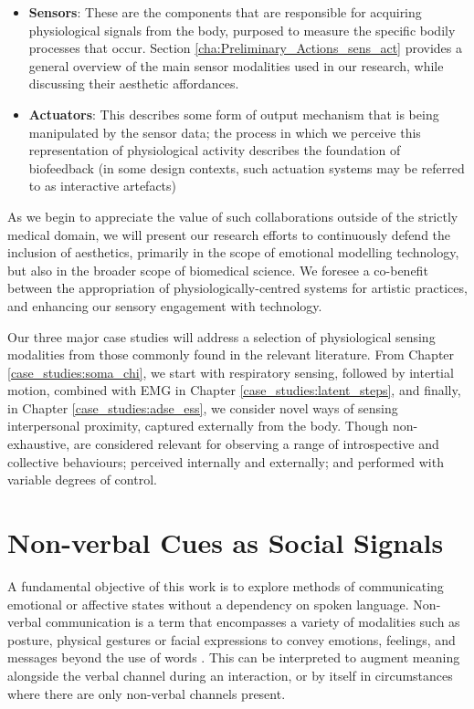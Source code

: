 \begin{itemize}
    \item \textbf{Sensors}: These are the components that are responsible for acquiring physiological signals from the body, purposed to measure the specific bodily processes that occur. Section \ref{cha:Preliminary_Actions_sens_act} provides a general overview of the main sensor modalities used in our research, while discussing their aesthetic affordances.
    \item \textbf{Actuators}: This describes some form of output mechanism that is being manipulated by the sensor data; the process in which we perceive this representation of physiological activity describes the foundation of biofeedback (in some design contexts, such actuation systems may be referred to as interactive artefacts)
\end{itemize}

As we begin to appreciate the value of such collaborations outside of the strictly medical domain, we will present our research efforts to continuously defend the inclusion of aesthetics, primarily in the scope of emotional modelling technology, but also in the broader scope of biomedical science. We foresee a co-benefit between the appropriation of physiologically-centred systems for artistic practices, and enhancing our sensory engagement with technology.

Our three major case studies will address a selection of physiological sensing modalities from those commonly found in the relevant literature. From Chapter \ref{case_studies:soma_chi}, we start with respiratory sensing, followed by intertial motion, combined with EMG in Chapter \ref{case_studies:latent_steps}, and finally, in Chapter \ref{case_studies:adse_ess}, we consider novel ways of sensing interpersonal proximity, captured externally from the body. Though non-exhaustive, are considered relevant for observing a range of introspective and collective behaviours; perceived internally and externally; and performed with variable degrees of control.

\section{Non-verbal Cues as Social Signals}

A fundamental objective of this work is to explore methods of communicating emotional or affective states without a dependency on spoken language. Non-verbal communication is a term that encompasses a variety of modalities such as posture, physical gestures or facial expressions to convey emotions, feelings, and messages beyond the use of words \cite{knapp_nonverbal_2009, richmond_nonverbal_2011}. This can be interpreted to augment meaning alongside the verbal channel during an interaction, or by itself in circumstances where there are only non-verbal channels present.

